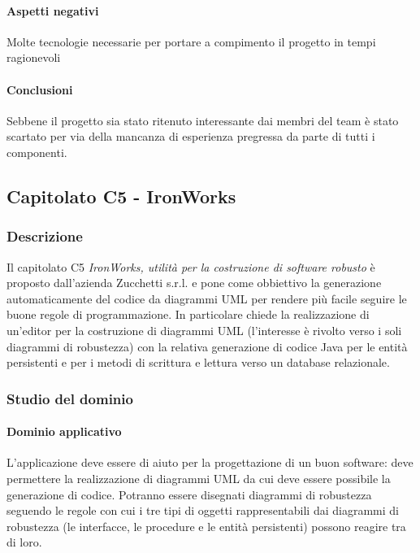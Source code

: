 	\paragraph{Aspetti negativi} \Spazio
     Molte tecnologie necessarie per portare a compimento il progetto in tempi ragionevoli

	\paragraph{Conclusioni} \Spazio
	Sebbene il progetto sia stato ritenuto interessante dai membri del team è stato scartato per via della mancanza di esperienza pregressa da parte di tutti i componenti.
	
	\subsection{Capitolato C5 - IronWorks}
		\subsubsection{Descrizione}
		Il capitolato C5 \emph{IronWorks, utilità per la costruzione di software robusto} è proposto dall'azienda Zucchetti s.r.l. e pone come obbiettivo la generazione automaticamente del codice da diagrammi UML per rendere più facile seguire le buone regole di programmazione. In particolare chiede la realizzazione di un'editor per la costruzione di diagrammi UML (l'interesse è rivolto verso i soli diagrammi di robustezza) con la relativa generazione di codice Java per le entità persistenti e per i metodi di scrittura e lettura verso un database relazionale. 
		\subsubsection{Studio del dominio}
			\paragraph{Dominio applicativo} \Spazio
			L'applicazione deve essere di aiuto per la progettazione di un buon software: deve permettere la realizzazione di diagrammi UML da cui deve essere possibile la generazione di codice. Potranno essere disegnati diagrammi di robustezza seguendo le regole con cui i tre tipi di oggetti rappresentabili dai diagrammi di robustezza (le interfacce, le procedure e le entità persistenti) possono reagire tra di loro.
